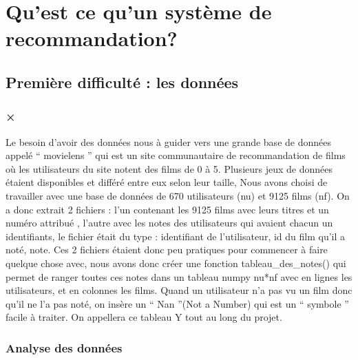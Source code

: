 \documentclass[a4paper,10pt]{article}
\title{}
\author{}
\begin{document}
\maketitle

\begin{abstract}
\end{abstract}

\section{Qu'est ce qu'un système de recommandation?}
\subsection{Première difficulté : les données}
\subsubsection[Extraction des données]{×}
Le besoin d'avoir des données nous à guider vers une grande base de données appelé `` movielens '' qui est un site communautaire de recommandation de films où les utilisateurs du site notent des films de 0 à 5.  
Plusieurs jeux de données étaient disponibles et différé entre eux selon leur taille,  
Nous avons choisi de travailler avec une base de données de 670 utilisateurs (nu) et 9125 films (nf).  
On a donc extrait 2 fichiers : l’un contenant les 9125 films avec leurs titres et un numéro attribué ,  
l’autre avec les notes des utilisateurs qui avaient chacun un identifiants,  
le fichier était du type : identifiant de l’utilisateur, id du film qu’il a noté, note. 
Ces 2 fichiers étaient donc peu pratiques pour commencer à faire quelque chose avec,  
nous avons donc créer une fonction tableau\_des\_notes() qui permet de ranger toutes ces notes dans un tableau numpy nu*nf avec en lignes les utilisateurs,  
et en colonnes les films. Quand un utilisateur n’a pas vu un film donc qu’il ne l’a pas noté,  
on insère un `` Nan ''(Not a Number) qui est un `` symbole '' facile à traiter. On appellera ce tableau Y tout au long du projet. 
\subsubsection{Analyse des données}
\end{document}
